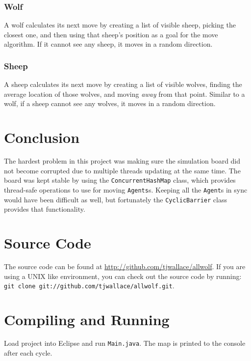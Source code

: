 \documentclass[pdftex,10pt]{article}
\begin{document}
\subsubsection{Wolf}\label{wolfMove}
A wolf calculates its next move by creating a list of visible sheep, picking the closest one, and then using that sheep's position as a goal for the move algorithm.  If it cannot see any sheep, it moves in a random direction.

\subsubsection{Sheep}\label{sheepMove}
A sheep calculates its next move by creating a list of visible wolves, finding the average location of those wolves, and moving {\em away} from that point.  Similar to a wolf, if a sheep cannot see any wolves, it moves in a random direction.

\section{Conclusion}\label{conclusion}
The hardest problem in this project was making sure the simulation board did not become corrupted due to multiple threads updating at the same time.  The board was kept stable by using the {\tt ConcurrentHashMap} class, which provides thread-safe operations to use for moving {\tt Agents}s.  Keeping all the {\tt Agent}s in sync would have been difficult as well, but fortunately the {\tt CyclicBarrier} class provides that functionality.

\appendix
\section{Source Code}
The source code can be found at \url{http://github.com/tjwallace/allwolf}.
If you are using a UNIX like environment, you can check out the source code by running: {\tt git clone git://github.com/tjwallace/allwolf.git}.

\section{Compiling and Running}
Load project into Eclipse and run {\tt Main.java}.  The map is printed to the console after each cycle.
\end{document}
